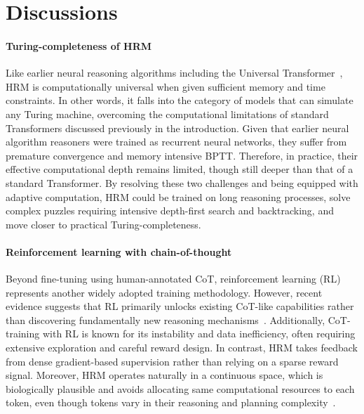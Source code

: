 \section{Discussions}

\paragraph{Turing-completeness of HRM}

Like earlier neural reasoning algorithms including the Universal Transformer~\citep{UniversalTransformer2018}, HRM is computationally universal when given sufficient memory and time constraints. In other words, it falls into the category of models that can simulate any Turing machine, overcoming the computational limitations of standard Transformers discussed previously in the introduction. Given that earlier neural algorithm reasoners were trained as recurrent neural networks, they suffer from premature convergence and memory intensive BPTT. Therefore, in practice, their effective computational depth remains limited, though still deeper than that of a standard Transformer. By resolving these two challenges and being equipped with adaptive computation, HRM could be trained on long reasoning processes, solve complex puzzles requiring intensive depth-first search and backtracking, and move closer to  practical Turing-completeness.

\paragraph{Reinforcement learning with chain-of-thought}

Beyond fine-tuning using human-annotated CoT, reinforcement learning (RL) represents another widely adopted training methodology. 
However, recent evidence suggests that RL primarily unlocks existing CoT-like capabilities rather than discovering fundamentally new reasoning mechanisms~\citep{wang2025,Muennighoff2025s1, lightr12025, limr2025}.
Additionally, CoT-training with RL is known for its instability and data inefficiency, often requiring extensive exploration and careful reward design. In contrast, HRM takes feedback from dense gradient-based supervision rather than relying on a sparse reward signal. Moreover, HRM 
operates naturally in a continuous space, which is biologically plausible and avoids allocating same computational resources to each token, even though tokens vary in their reasoning and planning complexity~\cite{CoconutLatentReasoning2024}.

